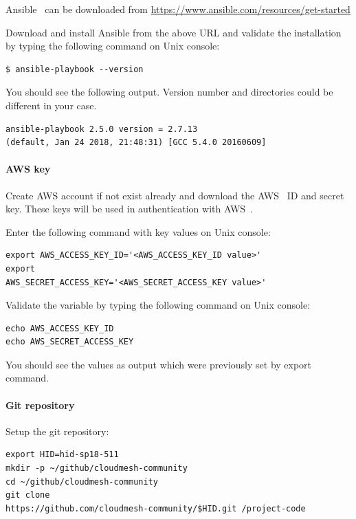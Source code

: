 Ansible~\cite{hid-sp18-511-www-ansible} can be downloaded from
\url{https://www.ansible.com/resources/get-started}

Download and install Ansible from the above URL and validate the
installation by typing the following command on Unix console:

\begin{verbatim}
$ ansible-playbook --version
\end{verbatim}

You should see the following output. Version number and directories
could be different in your case.

\begin{verbatim}
ansible-playbook 2.5.0 version = 2.7.13
(default, Jan 24 2018, 21:48:31) [GCC 5.4.0 20160609]
\end{verbatim}

\paragraph{AWS key}

Create AWS account if not exist already and download the
AWS~\cite{hid-sp18-511-www-aws} ID and secret key. These keys will be
used in authentication with AWS~\cite{hid-sp18-511-www-aws}.

Enter the following command with key values on Unix console:

\begin{verbatim}
export AWS_ACCESS_KEY_ID='<AWS_ACCESS_KEY_ID value>' 
export
AWS_SECRET_ACCESS_KEY='<AWS_SECRET_ACCESS_KEY value>'
\end{verbatim}

Validate the variable by typing the following command on Unix console:
\begin{verbatim}
echo AWS_ACCESS_KEY_ID
echo AWS_SECRET_ACCESS_KEY
\end{verbatim}

You should see the values as output which were previously set by
export command.

\paragraph{Git repository}

Setup the git repository:

\begin{verbatim}
export HID=hid-sp18-511 
mkdir -p ~/github/cloudmesh-community
cd ~/github/cloudmesh-community 
git clone
https://github.com/cloudmesh-community/$HID.git /project-code
\end{verbatim}

